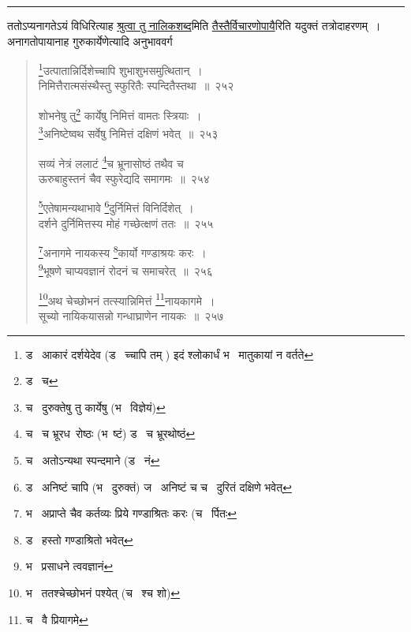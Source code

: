 \documentclass[11pt, openany]{book}
\begin{document}
\hrule

\vspace{2mm}
\noindent
ततोऽप्यनागतेऽयं विधिरित्याह \underline{श्रुत्वा तु नालिकशब्द}मिति \underline{तैस्तैर्विचारणोपायै}रिति यदुक्तं तत्रोदाहरणम्~। अनागतोपायानाह गुरुकार्येणेत्यादि अनुभाववर्ग\textendash

\newpage

\begin{quote}
{\na \renewcommand{\thefootnote}{1}\footnote{ड \textendash\  आकारं दर्शयेदेव (ड \textendash\  च्चापि तम् ) इदं श्लोकार्धं भ \textendash\  मातुकायां न वर्तते}उत्पातान्निर्दिशेच्चापि शुभाशुभसमुत्थितान्~।\\
निमित्तैरात्मसंस्थैस्तु स्फुरितैः स्पन्दितैस्तथा~॥~२५२

शोभनेषु तु\renewcommand{\thefootnote}{2}\footnote{ड \textendash\  च} कार्येषु निमित्तं वामतः स्त्रियाः~।\\
\renewcommand{\thefootnote}{3}\footnote{च \textendash\  दुरुक्तेषु तु कार्येषु (भ \textendash\  विज्ञेयं)}अनिष्टेष्वथ सर्वेषु निमित्तं दक्षिणं भवेत्~॥~२५३

सव्यं नेत्रं ललाटं \renewcommand{\thefootnote}{4}\footnote{च \textendash\  च भ्रूरध\textendash\ रोष्ठः (भ\textendash\ ष्टं) ड \textendash\  च भ्रूरथोष्ठं}च भ्रूनासोष्ठं तथैव च \\
ऊरुबाहुस्तनं चैव स्फुरेद्यदि समागमः~॥~२५४ 

\renewcommand{\thefootnote}{5}\footnote{च \textendash\  अतोऽन्यथा स्पन्दमाने (ड \textendash\  नं}एतेषामन्यथाभावे \renewcommand{\thefootnote}{6}\footnote{ड \textendash\  अनिष्टं चापि (भ \textendash\  दुरुक्तं) ज \textendash\  अनिष्टं च च \textendash\  दुरितं दक्षिणे भवेत्}दुर्निमित्तं विनिर्दिशेत्~। \\
दर्शने दुर्निमित्तस्य मोहं गच्छेत्क्षणं ततः~॥~२५५ 

\renewcommand{\thefootnote}{7}\footnote{भ \textendash\  अप्राप्ते चैव कर्तव्यः प्रिये गण्डाश्रितः करः (च \textendash\  र्पितः}अनागमे नायकस्य \renewcommand{\thefootnote}{8}\footnote{ड \textendash\  हस्तो गण्डाश्रितो भवेत्}कार्यो गण्डाश्रयः करः~।\\
\renewcommand{\thefootnote}{9}\footnote{भ \textendash\  प्रसाधने त्ववज्ञानं}भूषणे चाप्यवज्ञानं रोदनं च समाचरेत्~॥~२५६ 

\renewcommand{\thefootnote}{10}\footnote{भ \textendash\  ततश्चेच्छोभनं पश्येत् (च \textendash\  श्च शो)}अथ चेच्छोभनं तत्स्यान्निमित्तं \renewcommand{\thefootnote}{11}\footnote{च \textendash\  वै प्रियागमे}नायकागमे~।\\
सूच्यो नायिकयासन्नो गन्धाघ्राणेन नायकः~॥~२५७}
\end{quote}
\end{document}
